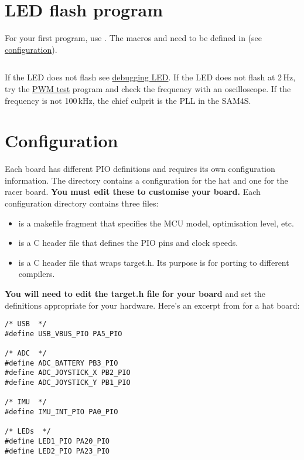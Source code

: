\section{LED flash program}
\label{led-flash-program}

For your first program, use
. The macros 
and  need to be defined in  (see
\protect\hyperref[configuration]{configuration}).

\inputminted{C}{../../src/test-apps/ledflash1/ledflash1.c}

If the LED does not flash see \hyperref[debugging-LED]{debugging LED}.
If the LED does not flash at 2\,Hz, try the \hyperref[pwm-test]{PWM
  test} program and check the frequency with an oscilloscope.  If the
frequency is not 100\,kHz, the chief culprit is the PLL in the SAM4S.


\section{Configuration}
\label{configuration}

Each board has different PIO definitions and requires its own
configuration information. The  directory contains a
configuration for the hat and one for the racer board.  \textbf{You
must edit these to customise your board.}  Each configuration
directory contains three files:

\begin{itemize}
\item
   is a makefile fragment that specifies the MCU model,
  optimisation level, etc.
\item
   is a C header file that defines the PIO pins and
  clock speeds.
\item
   is a C header file that wraps target.h. Its purpose
  is for porting to different compilers.
\end{itemize}

\textbf{You will need to edit the target.h file for your board} and set
the definitions appropriate for your hardware. Here's an excerpt from
 for a hat board:

\begin{verbatim}
/* USB  */
#define USB_VBUS_PIO PA5_PIO

/* ADC  */
#define ADC_BATTERY PB3_PIO
#define ADC_JOYSTICK_X PB2_PIO
#define ADC_JOYSTICK_Y PB1_PIO

/* IMU  */
#define IMU_INT_PIO PA0_PIO

/* LEDs  */
#define LED1_PIO PA20_PIO
#define LED2_PIO PA23_PIO
\end{verbatim}


